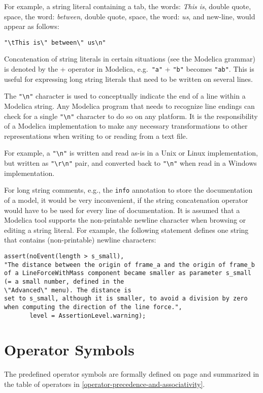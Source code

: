For example, a string literal containing a tab, the words: \emph{This is},
double quote, space, the word: \emph{between}, double quote, space, the word:
\emph{us}, and new-line, would appear as follows:
\begin{lstlisting}[language=modelica]
"\tThis is\" between\" us\n"
\end{lstlisting}

Concatenation of string literals in certain situations (see the Modelica
grammar) is denoted by the + operator in Modelica, e.g.\ \lstinline!"a"! + \lstinline!"b"!
becomes \lstinline!"ab"!. This is useful for expressing long string literals that
need to be written on several lines.

The \lstinline!"\n"! character is used to conceptually indicate the
end of a line within a Modelica string. Any Modelica program that needs
to recognize line endings can check for a single \lstinline!"\n"!
character to do so on any platform. It is the responsibility of a
Modelica implementation to make any necessary transformations to other
representations when writing to or reading from a text file.

\begin{nonnormative}
For example, a \lstinline!"\n"! is written and read as-is in a Unix or Linux implementation, but written as
\lstinline!"\r\n"! pair, and converted back to \lstinline!"\n"! when read in a Windows implementation.
\end{nonnormative}

\begin{nonnormative}
For long string comments, e.g., the \lstinline!info! annotation to
store the documentation of a model, it would be very inconvenient, if
the string concatenation operator would have to be used for every line
of documentation. It is assumed that a Modelica tool supports the
non-printable newline character when browsing or editing a string
literal. For example, the following statement defines one string that
contains (non-printable) newline characters:
\begin{lstlisting}[language=modelica]
assert(noEvent(length > s_small),
"The distance between the origin of frame_a and the origin of frame_b
of a LineForceWithMass component became smaller as parameter s_small
(= a small number, defined in the
\"Advanced\" menu). The distance is
set to s_small, although it is smaller, to avoid a division by zero
when computing the direction of the line force.",
       level = AssertionLevel.warning);
\end{lstlisting}
\end{nonnormative}

\section{Operator Symbols}\label{operator-symbols}

The predefined operator symbols are formally defined on page \pageref{lexical-conventions} and
summarized in the table of operators in \cref{operator-precedence-and-associativity}.
